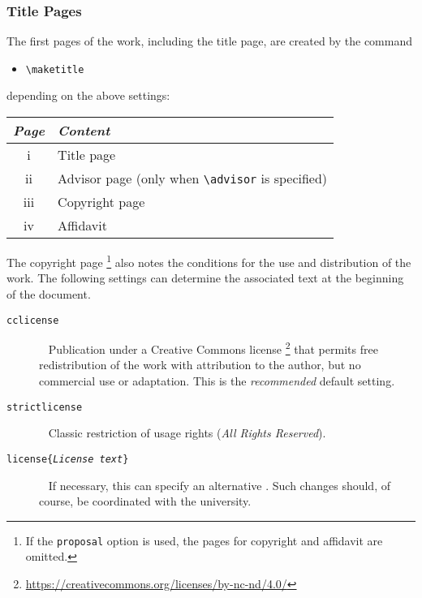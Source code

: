 \subsubsection{Title Pages}

The first pages of the work, including the title page, are created by the
command
%
\begin{itemize}
    \item[] \verb!\maketitle!
\end{itemize}
%
depending on the above settings:
%
\begin{center}
    \begin{tabular}{@{}cl@{}}
        \toprule
        \emph{Page} & \emph{Content} \\
        \midrule
        \textrm{i}   & Title page \\
        \textrm{ii}  & Advisor page (only when \verb!\advisor! is specified) \\
        \textrm{iii} & Copyright page \\
        \textrm{iv}  & Affidavit \\
        \bottomrule
    \end{tabular}
\end{center}
%
The copyright page%
\footnote{If the \texttt{proposal} option is used, the pages for copyright and
affidavit are omitted.}
also notes the conditions for the use and distribution of the work. The
following settings can determine the associated text at the beginning of the
document.
%
\begin{description}
    \item[\normalfont\texttt{{\bs}cclicense}] ~ \newline
    Publication under a Creative Commons license%
    \footnote{\url{https://creativecommons.org/licenses/by-nc-nd/4.0/}}
    that permits free redistribution of the work with attribution to the author,
    but no commercial use or adaptation. This is the \emph{recommended} default
    setting.
    \item[\normalfont\texttt{{\bs}strictlicense}] ~ \newline
    Classic restriction of usage rights (\emph{All Rights Reserved}).
    \item[\normalfont\texttt{{\bs}license\{\emph{License text}\}}] ~ \newline
    If necessary, this can specify an alternative .
    Such changes should, of course, be coordinated with the university.
\end{description}

